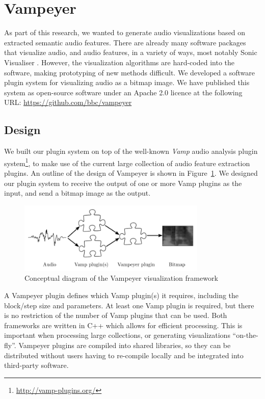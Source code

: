 \clearpage
\section{Vampeyer}\label{sec:vampeyer}
As part of this research, we wanted to generate audio visualizations based on extracted semantic audio features.  There
are already many software packages that visualize audio, and audio features, in a variety of ways, most notably Sonic
Visualiser \citep{Cannam2010}.  However, the visualization algorithms are hard-coded into the software, making
prototyping of new methods difficult.  We developed a software plugin system for visualizing audio as a bitmap image.
We have published this system as open-source software under an Apache 2.0 licence at the following URL:
\url{https://github.com/bbc/vampeyer}

\subsection{Design}
We built our plugin system on top of the well-known \textit{Vamp} audio analysis plugin
system\footnote{\url{http://vamp-plugins.org/}}, to make use of the current large collection of audio feature
extraction plugins.  An outline of the design of Vampeyer is shown in Figure~\ref{fig:vampeyer}.  We designed our
plugin system to receive the output of one or more Vamp plugins as the input, and send a bitmap image as the output.

\begin{figure}[ht]
  \centering
  \includegraphics[width=0.8\textwidth]{figs/vampeyer}
  \caption{Conceptual diagram of the Vampeyer visualization framework}
  \label{fig:vampeyer}
\end{figure}

A Vampeyer plugin defines which Vamp plugin(s) it requires, including the block/step size and parameters.  At least one
Vamp plugin is required, but there is no restriction of the number of Vamp plugins that can be used.  Both
frameworks are written in C++ which allows for efficient processing.  This is important when processing large
collections, or generating visualizations ``on-the-fly''.  Vampeyer plugins are compiled into shared libraries, so they can
be distributed without users having to re-compile locally and be integrated into third-party software.

